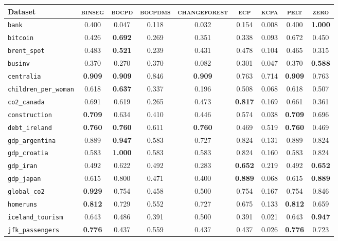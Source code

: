 \begin{tabular}{lcccccccc}
Dataset & \textsc{binseg} & \textsc{bocpd} & \textsc{bocpdms} & \textsc{changeforest} & \textsc{ecp} & \textsc{kcpa} & \textsc{pelt} & \textsc{zero}\\
\toprule
\verb+bank+ & 0.400 & 0.047 & 0.118 & 0.032 & 0.154 & 0.008 & 0.400 & \textbf{1.000}\\
\verb+bitcoin+ & 0.426 & \textbf{0.692} & 0.269 & 0.351 & 0.338 & 0.093 & 0.672 & 0.450\\
\verb+brent_spot+ & 0.483 & \textbf{0.521} & 0.239 & 0.431 & 0.478 & 0.104 & 0.465 & 0.315\\
\verb+businv+ & 0.370 & 0.270 & 0.370 & 0.082 & 0.301 & 0.047 & 0.370 & \textbf{0.588}\\
\verb+centralia+ & \textbf{0.909} & \textbf{0.909} & 0.846 & \textbf{0.909} & 0.763 & 0.714 & \textbf{0.909} & 0.763\\
\verb+children_per_woman+ & 0.618 & \textbf{0.637} & 0.337 & 0.196 & 0.508 & 0.068 & 0.618 & 0.507\\
\verb+co2_canada+ & 0.691 & 0.619 & 0.265 & 0.473 & \textbf{0.817} & 0.169 & 0.661 & 0.361\\
\verb+construction+ & \textbf{0.709} & 0.634 & 0.410 & 0.446 & 0.574 & 0.038 & \textbf{0.709} & 0.696\\
\verb+debt_ireland+ & \textbf{0.760} & \textbf{0.760} & 0.611 & \textbf{0.760} & 0.469 & 0.519 & \textbf{0.760} & 0.469\\
\verb+gdp_argentina+ & 0.889 & \textbf{0.947} & 0.583 & 0.727 & 0.824 & 0.131 & 0.889 & 0.824\\
\verb+gdp_croatia+ & 0.583 & \textbf{1.000} & 0.583 & 0.583 & 0.824 & 0.160 & 0.583 & 0.824\\
\verb+gdp_iran+ & 0.492 & 0.622 & 0.492 & 0.283 & \textbf{0.652} & 0.219 & 0.492 & \textbf{0.652}\\
\verb+gdp_japan+ & 0.615 & 0.800 & 0.471 & 0.400 & \textbf{0.889} & 0.068 & 0.615 & \textbf{0.889}\\
\verb+global_co2+ & \textbf{0.929} & 0.754 & 0.458 & 0.500 & 0.754 & 0.167 & 0.754 & 0.846\\
\verb+homeruns+ & \textbf{0.812} & 0.729 & 0.552 & 0.727 & 0.675 & 0.133 & \textbf{0.812} & 0.659\\
\verb+iceland_tourism+ & 0.643 & 0.486 & 0.391 & 0.500 & 0.391 & 0.021 & 0.643 & \textbf{0.947}\\
\verb+jfk_passengers+ & \textbf{0.776} & 0.437 & 0.559 & 0.437 & 0.437 & 0.026 & \textbf{0.776} & 0.723\\

\end{tabular}
